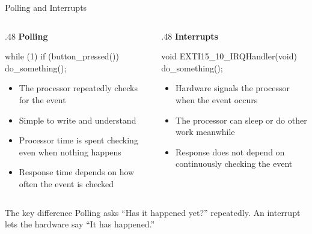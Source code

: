 \documentclass[9pt,aspectratio=169,xcolor=table]{beamer}
\begin{document}
\begin{frame}[fragile]{Polling and Interrupts}
	\begin{columns}[T]
		\begin{column}{.48\textwidth}
			\textbf{Polling}

			\vspace{1mm}
			\begin{cc}[basicstyle=\ttfamily\small]
while (1) {
	if (button_pressed())
		do_something();
}
\end{cc}

			\vspace{5mm}
			{\small
				\begin{itemize}\itemsep1pt
					\item The processor \alert{repeatedly checks} for the event
					\item Simple to write and understand
					\item Processor time is spent checking even when nothing happens
					\item Response time depends on how often the event is checked
			\end{itemize}}
		\end{column}

		\begin{column}{.48\textwidth}
			\textbf{Interrupts}

			\vspace{1mm}
			\begin{cc}[basicstyle=\ttfamily\small]
void EXTI15_10_IRQHandler(void) {
	do_something();
}
\end{cc}

			\vspace{5mm}
			{\small
				\begin{itemize}\itemsep1pt
					\item Hardware signals the processor when the event occurs
					\item The processor can sleep or do other work meanwhile
					\item Response does not depend on continuously checking the event
			\end{itemize}}
		\end{column}
	\end{columns}

	\vspace{3mm}
	\begin{block}{The key difference}
		\alert{Polling asks ``Has it happened yet?'' repeatedly.}
		An interrupt lets the hardware say ``It has happened.''
	\end{block}
\end{frame}
\end{document}
